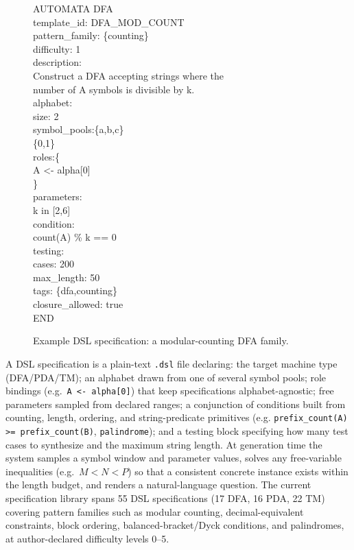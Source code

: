 \documentclass[sigconf]{acmart}
\begin{document}
\begin{figure}[t]
\centering
\begin{minipage}{0.95\linewidth}
\ttfamily
\begin{tabbing}
AUTOMATA DFA\\
template\_id: DFA\_MOD\_COUNT\\
pattern\_family: \{counting\}\\
difficulty: 1\\
description:\\
\quad Construct a DFA accepting strings where the\\
\quad number of A symbols is divisible by k.\\
alphabet:\\
\quad size: 2\\
\quad symbol\_pools:\{a,b,c\}\\
\quad\qquad\qquad\quad \{0,1\}\\
roles:\{\\
\quad A <- alpha[0]\\
\}\\
parameters:\\
\quad k in [2,6]\\
condition:\\
\quad count(A) \% k == 0\\
testing:\\
\quad cases: 200\\
\quad max\_length: 50\\
tags: \{dfa,counting\}\\
closure\_allowed: true\\
END
\end{tabbing}
\end{minipage}
\caption{Example DSL specification: a modular-counting DFA family.}
\label{lst:template}
\end{figure}

A DSL specification is a plain-text \texttt{.dsl} file declaring: the target machine type (DFA/PDA/TM); an alphabet drawn from one of several symbol pools; role bindings (e.g.\ \texttt{A <- alpha[0]}) that keep specifications alphabet-agnostic; free parameters sampled from declared ranges; a conjunction of conditions built from counting, length, ordering, and string-predicate primitives (e.g. \texttt{prefix\_count(A) >= prefix\_count(B)}, \texttt{palindrome}); and a testing block specifying how many test cases to synthesize and the maximum string length. At generation time the system samples a symbol window and parameter values, solves any free-variable inequalities (e.g.\ $M < N < P$) so that a consistent concrete instance exists within the length budget, and renders a natural-language question. The current specification library spans 55 DSL specifications (17 DFA, 16 PDA, 22 TM) covering pattern families such as modular counting, decimal-equivalent constraints, block ordering, balanced-bracket/Dyck conditions, and palindromes, at author-declared difficulty levels 0--5.
\end{document}

